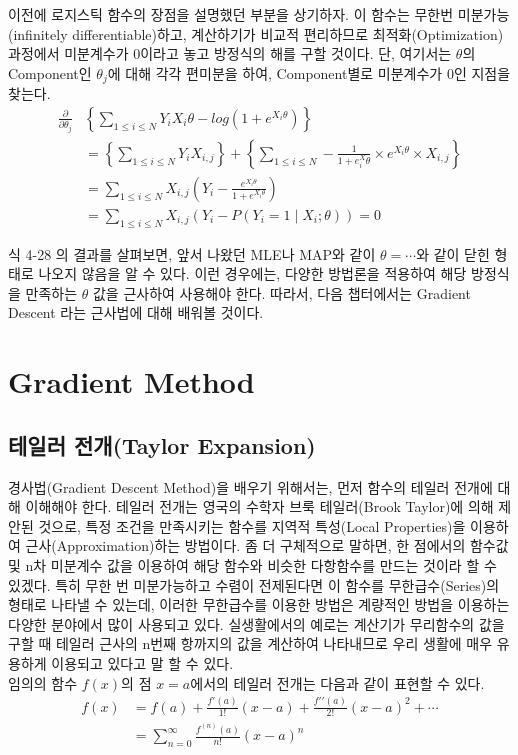 \documentclass[a4paper]{oblivoir}
\begin{document}
\indent 이전에 로지스틱 함수의 장점을 설명했던 부분을 상기하자. 이 함수는 무한번 미분가능(infinitely differentiable)하고, 계산하기가 비교적 편리하므로 최적화(Optimization) 과정에서 미분계수가 0이라고 놓고 방정식의 해를 구할 것이다. 단, 여기서는 $\theta$의 Component인 $\theta_{j}$에 대해 각각 편미분을 하여, Component별로 미분계수가 0인 지점을 찾는다.
\begin{align*}
\frac{\partial}{\partial \theta_{j}}&\left\{\sum_{1\le i\le N}Y_{i}X_{i}\theta - log(1+e^{X_{i}\theta})\right\} \tag{4-25}\\
&=\left\{\sum_{1\le i\le N}Y_{i}X_{i,j}\right\}+\left\{\sum_{1\le i\le N}-\frac{1}{1+e^X_{i}\theta}\times e^{X_{i}\theta}\times X_{i,j}\right\}								\tag{4-26}\\
&=\sum_{1\le i\le N}X_{i,j}\left(Y_{i}-\frac{e^{X_{i}\theta}}{1+e^{X_{i}\theta}} \right)	\tag{4-27}\\
&=\sum_{1\le i\le N}X_{i,j}(Y_{i}-P(Y_{i}=1 \mid X_{i};\theta)) =0					\tag{4-28}
\end{align*}

\indent 식 4-28 의 결과를 살펴보면, 앞서 나왔던 MLE나 MAP와 같이 $\theta = \cdots$와 같이 닫힌 형태로 나오지 않음을 알 수 있다. 이런 경우에는, 다양한 방법론을 적용하여 해당 방정식을 만족하는 $\theta$ 값을 근사하여 사용해야 한다. 따라서, 다음 챕터에서는 Gradient Descent 라는 근사법에 대해 배워볼 것이다.

\section{Gradient Method}

\subsection{테일러 전개(Taylor Expansion)}
경사법(Gradient Descent Method)을 배우기 위해서는, 먼저 함수의 테일러 전개에 대해 이해해야 한다. 테일러 전개는 영국의 수학자 브룩 테일러(Brook Taylor)에 의해 제안된 것으로, 특정 조건을 만족시키는 함수를 지역적 특성(Local Properties)을 이용하여 근사(Approximation)하는 방법이다. 좀 더 구체적으로 말하면, 한 점에서의 함수값 및 n차 미분계수 값을 이용하여 해당 함수와 비슷한 다항함수를 만드는 것이라 할 수 있겠다. 특히 무한 번 미분가능하고 수렴이 전제된다면 이 함수를 무한급수(Series)의 형태로 나타낼 수 있는데, 이러한 무한급수를 이용한 방법은 계량적인 방법을 이용하는 다양한 분야에서 많이 사용되고 있다. 실생활에서의 예로는 계산기가 무리함수의 값을 구할 때 테일러 근사의 n번째 항까지의 값을 계산하여 나타내므로 우리 생활에 매우 유용하게 이용되고 있다고 말 할 수 있다. \\
\indent 임의의 함수 $f(x)$의 점 $x=a$에서의 테일러 전개는 다음과 같이 표현할 수 있다.
\begin{align*}
f(x)	&=f(a) + \frac{f\prime(a)}{1!}(x-a) + \frac{f\prime \prime (a)}{2!}(x-a)^{2} + \cdots \tag{4-29}\\
	&=\sum_{n=0}^{\infty}\frac{f^{(n)}(a)}{n!}(x-a)^{n} \tag{4-30}
\end{align*}
\end{document}
